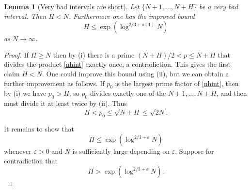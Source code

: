 \documentclass[12pt]{amsart}
\newtheorem{lemma}[theorem]{Lemma}
\newcommand{\eps}{\varepsilon}
\begin{document}
\begin{lemma}[Very bad intervals are short]\label{hvin}  Let $\{N+1,\dots,N+H\}$ be a very bad interval.  Then $H < N$.  Furthermore one has the improved bound
$$ H \leq \exp(\log^{2/3+o(1)} N)$$
as $N \to \infty$.
\end{lemma}

\begin{proof} If $H \geq N$ then by (i) there is a prime $(N+H)/2 < p \leq N+H$ that divides the product \eqref{nhint} exactly once, a contradiction.  This gives the first claim $H < N$.   One could improve this bound using (ii), but we can obtain a further improvement as follows.  If $p_0$ is the largest prime factor of \eqref{nhint}, then by (i) we have $p_0 > H$, so $p_0$ divides exactly one of the $N+1,\dots,N+H$, and then must divide it at least twice by (ii).  Thus
$$H < p_0 \leq \sqrt{N+H} \leq \sqrt{2N}.$$

It remains to show that
$$ H \leq \exp(\log^{2/3+\eps} N)$$
whenever $\eps>0$ and $N$ is sufficiently large depending on $\eps$.  Suppose for contradiction that
\begin{equation}\label{hnl}
 H > \exp(\log^{2/3+\eps} N).
\end{equation}


\end{proof}
\end{document}
